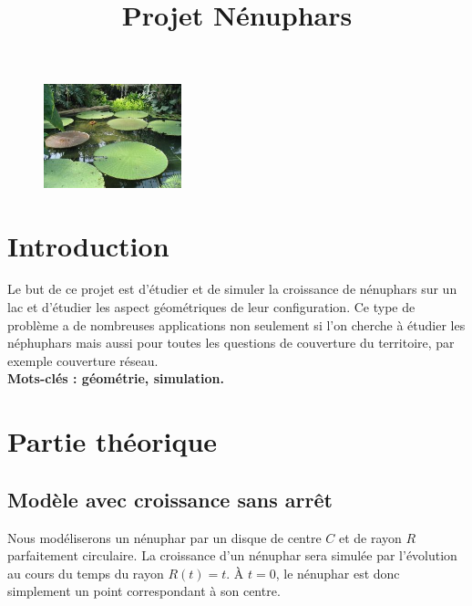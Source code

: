 \documentclass{../ficheTDTP}
\title{Projet Nénuphars}
\begin{document}
%

\maketitle

\begin{figure}[h]
\vspace{-5mm}
	\begin{center}
            \includegraphics[width=4cm]{nenuphar.jpg}
        \end{center}

\end{figure}

\section*{Introduction}

	Le but de ce projet est d'étudier et de simuler la croissance de nénuphars sur un lac et d'étudier les aspect géométriques de leur configuration. Ce type de problème a de nombreuses applications non seulement si l'on cherche à étudier les néphuphars mais aussi pour toutes les questions de couverture du territoire, par exemple couverture réseau. \\

\textbf{Mots-clés : géométrie, simulation.}

\medskip



\section{Partie théorique}

\subsection{Modèle avec croissance sans arrêt}

	Nous modéliserons un nénuphar par un disque de centre $C$ et de rayon $R$ parfaitement circulaire. La croissance d'un nénuphar sera simulée par l'évolution au cours du temps du rayon $R(t) = t$. À $t=0$, le nénuphar est donc simplement un point correspondant à son centre.\\
\end{document}

